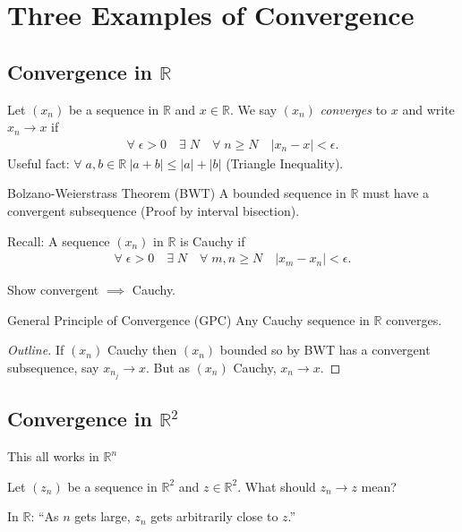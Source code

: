 \section{Three Examples of Convergence} \label{sec:1}
\subsection{Convergence in $\mathbb{R}$}
Let $(x_n)$ be a sequence in $\mathbb{R}$ and $x \in \mathbb{R}$.
We say $(x_n)$ \textit{converges} to $x$ and write $x_n \to x$ if
\begin{align*}
    \forall \; \epsilon > 0 \quad \exists \; N \quad \forall \; n \geq N \quad |x_n - x| < \epsilon.
\end{align*} 
Useful fact: $\forall \; a, b \in \mathbb{R} \ |a+b| \leq |a| + |b|$ (Triangle Inequality).

Bolzano-Weierstrass Theorem (BWT)
A bounded sequence in $\mathbb{R}$ must have a convergent subsequence (Proof by interval bisection).

Recall: A sequence $(x_n)$ in $\mathbb{R}$ is Cauchy if 
\begin{align*}
    \forall \; \epsilon > 0 \quad \exists \; N \quad \forall \; m, n \geq N \quad |x_m - x_n| < \epsilon.
\end{align*} 

\begin{exercise}[Easy]
    Show convergent $\implies$ Cauchy.
\end{exercise} 

General Principle of Convergence (GPC)
Any Cauchy sequence in $\mathbb{R}$ converges.

\begin{proof}[Outline]
    If $(x_n)$ Cauchy then $(x_n)$ bounded so by BWT has a convergent subsequence, say $x_{n_j} \to x$.
    But as $(x_n)$ Cauchy, $x_n \to x$.
\end{proof} 

\subsection{Convergence in $\mathbb{R}^2$}
\begin{remark}
    This all works in $\mathbb{R}^n$
\end{remark} 

Let $(z_n)$ be a sequence in $\mathbb{R}^2$ and $z \in \mathbb{R}^2$.
What should $z_n \to z$ mean?

In $\mathbb{R}$: ``As $n$ gets large, $z_n$ gets arbitrarily close to $z$.''

